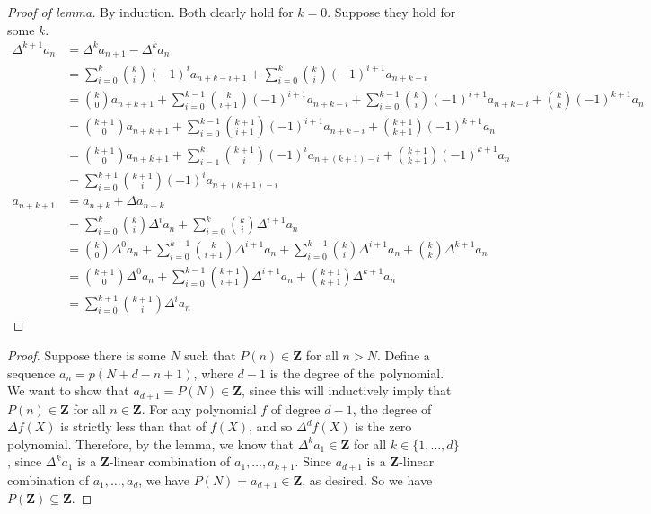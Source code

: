 \documentclass[10pt]{article}
\newcommand{\Z}{\mathbf{Z}}
\begin{document}
\begin{enumerate}
\begin{enumerate}
\begin{proof}[Proof of lemma]
By induction.  Both clearly hold for $k=0$.  Suppose they hold for some $k$.
\begin{align*}
\Delta^{k+1} a_n &= \Delta^k a_{n+1} - \Delta^k a_n
\\
&= \sum_{i=0}^k \binom{k}{i}(-1)^i a_{n+k-i+1} + \sum_{i=0}^k \binom{k}{i}(-1)^{i+1} a_{n+k-i}
\\
&= \binom{k}{0} a_{n+k+1} + \sum_{i=0}^{k-1} \binom{k}{i+1}(-1)^{i+1} a_{n+k-i} + \sum_{i=0}^{k-1} \binom{k}{i}(-1)^{i+1} a_{n+k-i} + \binom{k}{k} (-1)^{k+1} a_n \\
&= \binom{k+1}{0} a_{n+k+1} + \sum_{i=0}^{k-1} \binom{k+1}{i+1}(-1)^{i+1} a_{n+k-i} + \binom{k+1}{k+1} (-1)^{k+1} a_n
\\
&= \binom{k+1}{0} a_{n+k+1} + \sum_{i=1}^{k} \binom{k+1}{i}(-1)^{i} a_{n+(k+1)-i} + \binom{k+1}{k+1} (-1)^{k+1} a_n
\\
&= \sum_{i=0}^{k+1} \binom{k+1}{i}(-1)^{i} a_{n+(k+1)-i}
\\
a_{n+k+1} &= a_{n+k} + \Delta a_{n+k}
\\
&= \sum_{i=0}^k \binom{k}{i} \Delta^{i} a_n + \sum_{i=0}^k \binom{k}{i} \Delta^{i+1} a_n
\\
&= \binom{k}{0} \Delta^0 a_n + \sum_{i=0}^{k-1} \binom{k}{i+1} \Delta^{i+1} a_n + \sum_{i=0}^{k-1} \binom{k}{i} \Delta^{i+1} a_n + \binom{k}{k}\Delta^{k+1}a_n
\\
&= \binom{k+1}{0} \Delta^0 a_n + \sum_{i=0}^{k-1} \binom{k+1}{i+1} \Delta^{i+1} a_n + \binom{k+1}{k+1}\Delta^{k+1}a_n
\\
&= \sum_{i=0}^{k+1} \binom{k+1}{i} \Delta^{i} a_n
\end{align*}

\end{proof}

\begin{proof}
Suppose there is some $N$ such that $P(n) \in \Z$ for all $n > N$.  Define a sequence $a_n = p(N+d-n+1)$, where $d-1$ is the degree of the polynomial.  We want to show that $a_{d+1} = P(N) \in \Z$, since this will inductively imply that $P(n) \in \Z$ for all $n \in \Z$.  For any polynomial $f$ of degree $d-1$, the degree of $\Delta f(X)$ is strictly less than that of $f(X)$, and so $\Delta^{d} f(X)$ is the zero polynomial.  Therefore, by the lemma, we know that $\Delta^k a_1 \in \Z$ for all $k \in \{1, \dots , d\}$, since $\Delta^k a_1$ is a $\Z$-linear combination of $a_1, \dots , a_{k+1}$.  Since $a_{d+1}$ is a $\Z$-linear combination of $a_1, \dots , a_d$, we have $P(N) = a_{d+1} \in \Z$, as desired.  So we have $P(\Z) \subseteq \Z$.


\end{proof}
\end{enumerate}
\end{enumerate}
\end{document}
